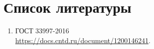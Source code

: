 \documentclass[./nirs.tex]{subfiles}
\begin{document}
\section*{Список литературы}
\begin{enumerate}
	\item ГОСТ 33997-2016 \\
	\url{https://docs.cntd.ru/document/1200146241}.


\end{enumerate}
\end{document}
